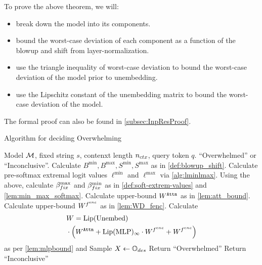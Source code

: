 To prove the above theorem, we will:
\begin{itemize}[nosep]
    \item break down the model into its components.
    \item bound the worst-case deviation of each component as a function of the blowup and shift from layer-normalization.
    \item use the triangle inequality of worst-case deviation to bound the worst-case deviation of the model prior to unembedding.
    \item use the Lipschitz constant of the unembedding matrix to bound the worst-case deviation of the model.
\end{itemize}
The formal proof can also be found in \cref{subsec:InpResProof}.

\begin{algorithm}[tb] 
	\caption{Algorithm for deciding Overwhelming}
	\label{alg:overwhelmCheckDet}
	\begin{algorithmic}
		  Model $\mathcal{M}$, fixed string $s$, contenxt length ${n_{ctx}}$, query token $q$.
		 ``Overwhelmed'' or ``Inconclusive''.
		\STATE
		\STATE Calculate $B^{\min}, B^{\max}, S^{\min}, S^{\max}$ as in \cref{def:blowup_shift}.
            \STATE Calculate pre-softmax extremal logit values $\ell^{\min}$ and $\ell^{\max}$ via \cref{alg:lminlmax}.
		\STATE Using the above, calculate ${\beta}_{fix}^{\max}$ and ${\beta}_{fix}^{\min}$ as in \cref{def:soft-extrem-values} and \cref{lem:min_max_softmax}.
		\STATE Calculate upper-bound $W^{\texttt{Attn}}$ as in \cref{lem:att_bound}.
		\STATE Calculate upper-bound $W^{f^{enc}}$ as in \cref{lem:WD_fenc}.
		\STATE Calculate \begin{align*}
			&W = \mathrm{Lip}(\mathrm{Unembed}) \\
                &\cdot \left(W^{\texttt{Attn}} + \mathrm{Lip}({\text{MLP}})_\infty \cdot W^{f^{enc}} + W^{f^{enc}}\right)
		\end{align*}
		as per \cref{lem:mlpbound} and 
		\STATE Sample $X \gets \mathbb{O}_{des}$
		\STATE Return ``Overwhelmed''
		\ELSE
		\STATE Return ``Inconclusive''
		\ENDIF
	\end{algorithmic}
\end{algorithm}


